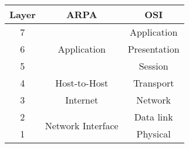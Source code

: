 
\begin{tabular}{ |c|c|c| }
\hline
	Layer & ARPA & OSI \\
	\hline
	7 & \multirow{3}{*}{Application} & Application \\
	6 & & Presentation \\
	5 & & Session \\
	\hline
	4 & Host-to-Host & Transport \\
	\hline
	3 & Internet & Network \\
	\hline
	2 & \multirow{2}{*}{Network Interface} & Data link \\
	1 & & Physical \\
	\hline
\end{tabular}
